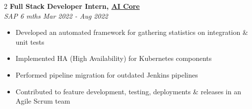 \documentclass[a4paper,11pt]{article}
\newcommand{\entryHeader}[2]{\noindent\textbf{#1} \\ \textit{#2}}
\begin{document}
\begin{multicols}{2}
\smallskip
\entryHeader{Full Stack Developer Intern, \href{https://help.sap.com/docs/AI_CORE}{AI Core}}{SAP \hfill 6 mths \textbar{} Mar 2022 - Aug 2022}
\begin{itemize}
    \item Developed an automated framework for gathering statistics on integration \& unit tests
    \item Implemented HA (High Availability) for Kubernetes components
    \item Performed pipeline migration for outdated Jenkins pipelines
    \item Contributed to feature development, testing, deployments \& releases in an Agile Scrum team
\end{itemize}

\end{multicols}
\newpage
\end{document}
